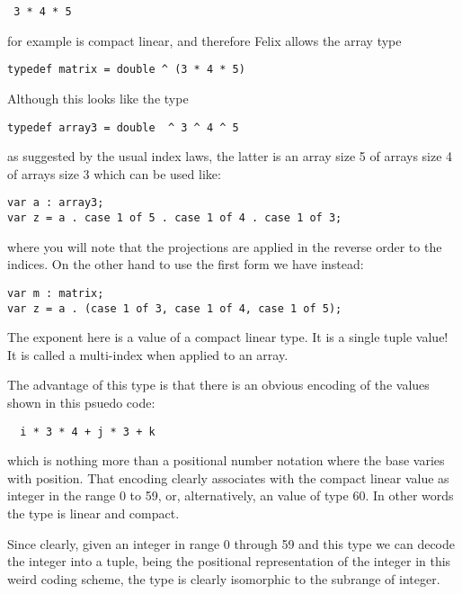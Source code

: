 \documentclass[oneside]{book}
\begin{document}
\begin{verbatim}
 3 * 4 * 5
\end{verbatim}

for example is compact linear, and therefore Felix allows the array type

\begin{verbatim}
typedef matrix = double ^ (3 * 4 * 5)
\end{verbatim}

Although this looks like the type

\begin{verbatim}
typedef array3 = double  ^ 3 ^ 4 ^ 5
\end{verbatim}

as suggested by the usual index laws, the latter is an array size 5 of
arrays size 4 of arrays size 3 which can be used like:

\begin{verbatim}
var a : array3;
var z = a . case 1 of 5 . case 1 of 4 . case 1 of 3;
\end{verbatim}

where you will note that the projections are applied in the reverse
order to the indices. On the other hand to use the first form we have
instead:

\begin{verbatim}
var m : matrix;
var z = a . (case 1 of 3, case 1 of 4, case 1 of 5);
\end{verbatim}

The exponent here is a value of a compact linear type.
It is a single tuple value! It is called a multi-index
when applied to an array.

The advantage of this type is that there is an obvious
encoding of the values shown in this psuedo code:

\begin{verbatim}
  i * 3 * 4 + j * 3 + k
\end{verbatim}

which is nothing more than a positional number notation where the
base varies with position. That encoding clearly associates
with the compact linear value as integer in the range 0 to 59,
or, alternatively, an value of type 60. In other words the type
is linear and compact.

Since clearly, given an integer in range 0 through 59 and this type
we can decode the integer into a tuple, being the positional representation
of the integer in this weird coding scheme, the type is clearly
isomorphic to the subrange of integer.
\end{document}
